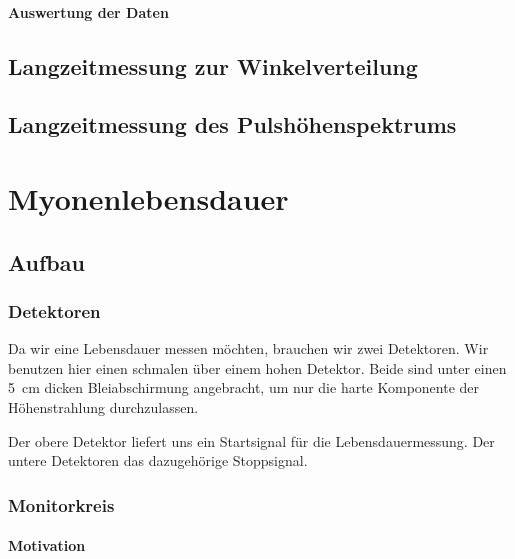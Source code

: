 \documentclass[11pt, ngerman, fleqn, DIV=15, headinclude, BCOR=2cm]{scrreprt}
\begin{document}

\subsubsection{Auswertung der Daten}

\section{Langzeitmessung zur Winkelverteilung}
\label{sec:langzeit_winkel}

\section{Langzeitmessung des Pulshöhenspektrums}
\label{sec:langzeit_puls}

\chapter{Myonenlebensdauer}

\section{Aufbau}

\subsection{Detektoren}

Da wir eine Lebensdauer messen möchten, brauchen wir zwei Detektoren. Wir
benutzen hier einen schmalen über einem hohen Detektor. Beide sind unter einen
\SI{5}{\centi\meter} dicken Bleiabschirmung angebracht, um nur die harte
Komponente der Höhenstrahlung durchzulassen.

Der obere Detektor liefert uns ein Startsignal für die Lebensdauermessung. Der
untere Detektoren das dazugehörige Stoppsignal.

\subsection{Monitorkreis}

\subsubsection{Motivation}
\end{document}
